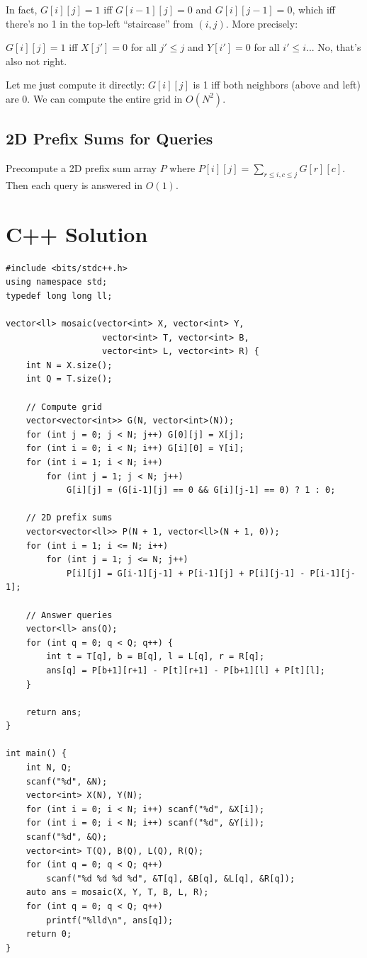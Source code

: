 \documentclass[11pt,a4paper]{article}
\begin{document}
In fact, $G[i][j] = 1$ iff $G[i-1][j] = 0$ and $G[i][j-1] = 0$, which iff there's no 1 in the top-left ``staircase'' from $(i,j)$. More precisely:

$G[i][j] = 1$ iff $X[j'] = 0$ for all $j' \le j$ and $Y[i'] = 0$ for all $i' \le i$... No, that's also not right.

Let me just compute it directly: $G[i][j]$ is 1 iff both neighbors (above and left) are 0. We can compute the entire grid in $O(N^2)$.

\subsection{2D Prefix Sums for Queries}
Precompute a 2D prefix sum array $P$ where $P[i][j] = \sum_{r \le i, c \le j} G[r][c]$. Then each query is answered in $O(1)$.

\section{C++ Solution}

\begin{lstlisting}
#include <bits/stdc++.h>
using namespace std;
typedef long long ll;

vector<ll> mosaic(vector<int> X, vector<int> Y,
                   vector<int> T, vector<int> B,
                   vector<int> L, vector<int> R) {
    int N = X.size();
    int Q = T.size();

    // Compute grid
    vector<vector<int>> G(N, vector<int>(N));
    for (int j = 0; j < N; j++) G[0][j] = X[j];
    for (int i = 0; i < N; i++) G[i][0] = Y[i];
    for (int i = 1; i < N; i++)
        for (int j = 1; j < N; j++)
            G[i][j] = (G[i-1][j] == 0 && G[i][j-1] == 0) ? 1 : 0;

    // 2D prefix sums
    vector<vector<ll>> P(N + 1, vector<ll>(N + 1, 0));
    for (int i = 1; i <= N; i++)
        for (int j = 1; j <= N; j++)
            P[i][j] = G[i-1][j-1] + P[i-1][j] + P[i][j-1] - P[i-1][j-1];

    // Answer queries
    vector<ll> ans(Q);
    for (int q = 0; q < Q; q++) {
        int t = T[q], b = B[q], l = L[q], r = R[q];
        ans[q] = P[b+1][r+1] - P[t][r+1] - P[b+1][l] + P[t][l];
    }

    return ans;
}

int main() {
    int N, Q;
    scanf("%d", &N);
    vector<int> X(N), Y(N);
    for (int i = 0; i < N; i++) scanf("%d", &X[i]);
    for (int i = 0; i < N; i++) scanf("%d", &Y[i]);
    scanf("%d", &Q);
    vector<int> T(Q), B(Q), L(Q), R(Q);
    for (int q = 0; q < Q; q++)
        scanf("%d %d %d %d", &T[q], &B[q], &L[q], &R[q]);
    auto ans = mosaic(X, Y, T, B, L, R);
    for (int q = 0; q < Q; q++)
        printf("%lld\n", ans[q]);
    return 0;
}
\end{lstlisting}
\end{document}
